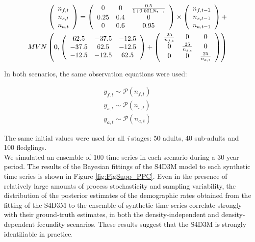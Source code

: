 \documentclass[12pt,a4paper]{article}
\begin{document}
\begin{align}\label{FullModel_DD}
	\left(\begin{array}{c}
		{n_{f, t}} \\ 
		{n_{s, t}} \\ 
		{n_{a, t}}
	\end{array}\right)=
	\left(\begin{array}{ccc}{0} & {0} & {\frac{0.5}{1+0.001N_{t-1}}} \\
		{0.25} & {0.4} & {0} \\
		{0} & {0.6} & {0.95}
	\end{array}\right)
	\times\left(\begin{array}{c}
		{n_{f, t-1}} \\ 
		{n_{s, t-1}} \\ 
		{n_{a, t-1}}
	\end{array}\right)+ \notag \\
	MVN\left(0,\left(\begin{array}{ccc}
		{62.5} & {-37.5} & {-12.5} \\
		{-37.5} & {62.5} & {-12.5} \\
		{-12.5} & {-12.5} & {62.5}
	\end{array}\right)+\left(\begin{array}{ccc}
		{\frac{25}{n_{f, t}}} & {0} & {0} \\
		{0} & {\frac{25}{n_{s, t}}} & {0} \\
		{0} & {0} & {\frac{25}{n_{a, t}}}\end{array}\right)\right)\end{align}

In both scenarios, the same observation equations were used:

\begin{equation}\label{ObsEqns2}
	\begin{array}
		{l}{y_{f, t} \sim \mathcal{P}(n_{f, t})} \\
		{y_{s, t} \sim \mathcal{P}(n_{s, t})} \\
		{y_{a, t} \sim \mathcal{P}(n_{a, t})}
	\end{array}
\end{equation}

The same initial values were used for all \textit{i} stages: 50 adults, 40 sub-adults and 100 fledglings.\\

We simulated an ensemble of 100 time series in each scenario during a 30 year period. The results of the Bayesian fittings of the S4D3M model to each synthetic time series is shown in Figure \ref{fig:FigSupp_PPC}. Even in the presence of relatively large amounts of process stochasticity and sampling variability, the distribution of the posterior estimates of the demographic rates obtained from the fitting of the S4D3M to the ensemble of synthetic time series correlate strongly with their ground-truth estimates, in both the density-independent and density-dependent fecundity scenarios. These results suggest that the S4D3M is strongly identifiable in practice.\\
\end{document}
